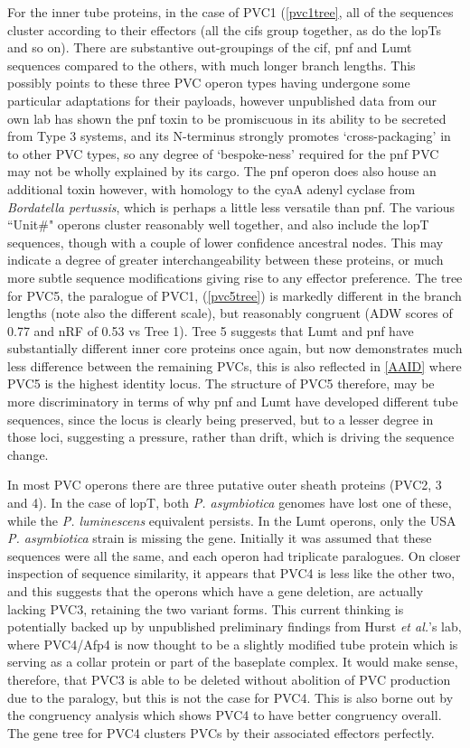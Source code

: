 For the inner tube proteins, in the case of PVC1 (\vref{pvc1tree}, all of the sequences cluster according to their effectors (all the cifs group together, as do the lopTs and so on). There are substantive out-groupings of the cif, pnf and Lumt sequences compared to the others, with much longer branch lengths. This possibly points to these three PVC operon types having undergone some particular adaptations for their payloads, however unpublished data from our own lab has shown the pnf toxin to be promiscuous in its ability to be secreted from Type 3 systems, and its N-terminus strongly promotes `cross-packaging' in to other PVC types, so any degree of `bespoke-ness' required for the pnf PVC may not be wholly explained by its cargo. The pnf operon does also house an additional toxin however, with homology to the cyaA adenyl cyclase from \emph{Bordatella pertussis}, which is perhaps a little less versatile than pnf. The various ``Unit\#" operons cluster reasonably well together, and also include the lopT sequences, though with a couple of lower confidence ancestral nodes. This may indicate a degree of greater interchangeability between these proteins, or much more subtle sequence modifications giving rise to any effector preference. The tree for PVC5, the paralogue of PVC1, (\vref{pvc5tree}) is markedly different in the branch lengths (note also the different scale), but reasonably congruent (ADW scores of 0.77 and nRF of 0.53 vs Tree 1). Tree 5 suggests that Lumt and pnf have substantially different inner core proteins once again, but now demonstrates much less difference between the remaining PVCs, this is also reflected in \vref{AAID} where PVC5 is the highest identity locus. The structure of PVC5 therefore, may be more discriminatory in terms of why pnf and Lumt have developed different tube sequences, since the locus is clearly being preserved, but to a lesser degree in those loci, suggesting a pressure, rather than drift, which is driving the sequence change.

In most PVC operons there are three putative outer sheath proteins (PVC2, 3 and 4). In the case of lopT, both \emph{P. asymbiotica} genomes have lost one of these, while the \emph{P. luminescens} equivalent persists. In the Lumt operons, only the USA \emph{P. asymbiotica} strain is missing the gene. Initially it was assumed that these sequences were all the same, and each operon had triplicate paralogues. On closer inspection of sequence similarity, it appears that PVC4 is less like the other two, and this suggests that the operons which have a gene deletion, are actually lacking PVC3, retaining the two variant forms. This current thinking is potentially backed up by unpublished preliminary findings from Hurst \emph{et al.}'s lab, where PVC4/Afp4 is now thought to be a slightly modified tube protein which is serving as a collar protein or part of the baseplate complex. It would make sense, therefore, that PVC3 is able to be deleted without abolition of PVC production due to the paralogy, but this is not the case for PVC4. This is also borne out by the congruency analysis which shows PVC4 to have better congruency overall. The gene tree for PVC4 clusters PVCs by their associated effectors perfectly.

